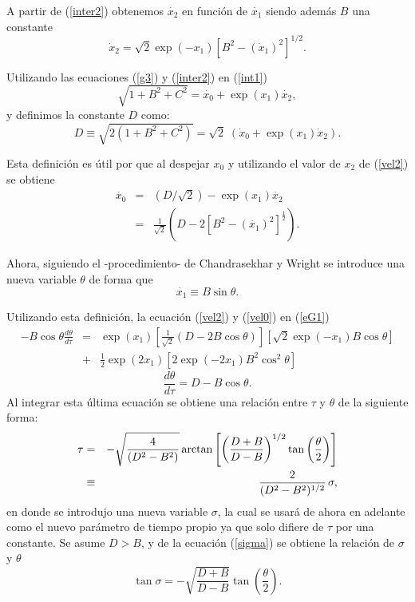 \documentclass[11pt]{book}
\begin{document}
A partir de (\ref{inter2}) obtenemos $\dot{x_2}$ en función de $\dot{x_1}$ siendo además $B$ una constante
\begin{equation}
\dot x_2 = \sqrt {2} \exp (- x_1) [B^2 - (\dot x_1)^2]^{1/2}.
\label{vel2}
\end{equation}

Utilizando las ecuaciones (\ref{g3}) y (\ref{inter2}) en (\ref{int1})
\begin{equation}
\sqrt{1+B^2+C^2}=\dot{x_0}+ \exp(x_1)\dot{x_2},
\end{equation}
y definimos la constante $D$ como:
\begin{equation}
D \equiv \sqrt{2 (1 + B^2 + C^2) } = \sqrt{2 }\; (\dot x_0 + \exp(x_1)\dot x_2) .
\end{equation}

Esta definición es útil por que al despejar $x_0$ y utilizando el valor de $x_2$ de (\ref{vel2}) se obtiene
\begin{eqnarray}
\dot{x_0}&=&(D/\sqrt{2})- \exp(x_1)\dot{x_2}\nonumber
\\ 
&=&\frac{1}{\sqrt{2}}\left( D-2 \left[B^2-(\dot{x_1})^2 \right]^{\frac{1}{2}} \right) .
\label{vel0}
\end{eqnarray}

Ahora, siguiendo el -procedimiento- de Chandrasekhar y Wright %
se introduce una nueva variable $\theta$ de forma que
\begin{equation}
\dot{x_1} \equiv B \sin \theta .
\label{vel1}
\end{equation}

Utilizando esta definición, la ecuación (\ref{vel2}) y (\ref{vel0}) en (\ref{eG1})
\begin{eqnarray}
-B \cos \theta \frac{d\theta}{d\tau}&=& \exp(x_1) \left[ \frac{1}{\sqrt{2}} \left( D -2B \cos \theta \right) \right] \left[ \sqrt{2}\exp (-x_1)B \cos \theta \right] \nonumber \\ \nonumber
&+& \frac{1}{2} \exp(2x_1) \left[ 2\exp (-2x_1)B^2 \cos^2 \theta \right]
\end{eqnarray}
%
\begin{equation}
\frac{d\theta}{d\tau}= D - B \cos \theta.
\end{equation}
Al integrar esta última ecuación se obtiene una relación entre $\tau$ y $\theta$ de la siguiente forma:
\begin{eqnarray}
\tau &=& - \sqrt{ \frac{4}{(D^2-B^2)}} \arctan \left[ \left( \frac{D+B}{D-B} \right)^{1/2} \tan \left( \frac{\theta}{2} \right) \right] \cr
&\equiv& \frac{2}{(D^2-B^2)^{1/2}}\, \sigma,
\label{sigma}
\end{eqnarray}
en donde se introdujo una nueva variable $\sigma$, la cual se usará de ahora en adelante como el nuevo parámetro de tiempo propio ya que solo difiere de $\tau$ por una constante. Se asume $D>B$, y de la ecuación (\ref{sigma}) se obtiene la relación de $\sigma$ y $\theta$
\begin{equation} 
\tan \sigma = - \sqrt{\frac{D+B}{D-B}} \tan \left(\frac{\theta}{2}\right).
\label{tansigma}
\end{equation}
\end{document}
